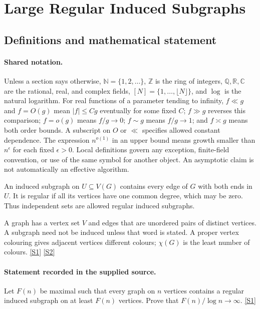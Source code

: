 \documentclass[11pt,a4paper]{article}
\newcommand{\N}{\mathbb{N}}
\newcommand{\Z}{\mathbb{Z}}
\newcommand{\Q}{\mathbb{Q}}
\newcommand{\R}{\mathbb{R}}
\newcommand{\C}{\mathbb{C}}
\newcommand{\sref}[2]{\hyperlink{source:#1:#2}{[S#2]}}
\begin{document}
\section{Large Regular Induced Subgraphs}\label{statement}


\subsection{Definitions and mathematical statement}

\paragraph{Shared notation.}Unless a section says otherwise, $\N=\{1,2,\ldots\}$,
$\Z$ is the ring of integers, $\Q,\R,\C$ are the rational, real, and complex
fields, $[N]=\{1,\ldots,\lfloor N\rfloor\}$, and $\log$ is the natural
logarithm. For real functions of a parameter tending to infinity,
$f\ll g$ and $f=O(g)$ mean $|f|\leq Cg$ eventually for some fixed $C$;
$f\gg g$ reverses this comparison; $f=o(g)$ means $f/g\to0$;
$f\sim g$ means $f/g\to1$; and $f\asymp g$ means both order bounds.
A subscript on $O$ or $\ll$ specifies allowed constant dependence.
The expression $n^{o(1)}$ in an upper bound means growth smaller than
$n^\epsilon$ for each fixed $\epsilon>0$. Local definitions govern any
exception, finite-field convention, or use of the same symbol for another
object. An asymptotic claim is not automatically an effective algorithm.



An induced subgraph on $U\subseteq V(G)$ contains every edge of $G$ with both ends in $U$. It is regular if all its vertices have one common degree, which may be zero. Thus independent sets are allowed regular induced subgraphs.

A graph has a vertex set $V$ and edges that are unordered pairs of distinct vertices. A subgraph need not be induced unless that word is stated. A proper vertex colouring gives adjacent vertices different colours; $\chi(G)$ is the least number of colours. \sref{statement}{1} \sref{statement}{2}

\paragraph{Statement recorded in the supplied source.}
Let $F(n)$ be maximal such that every graph on $n$ vertices contains a regular induced subgraph on at least $F(n)$ vertices. Prove that $F(n)/\log n\to \infty$. \sref{statement}{1}
\end{document}
